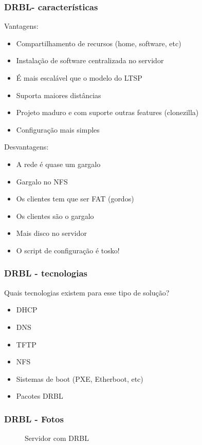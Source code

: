 \documentclass[utf8,9pt]{beamer}
\begin{document}
	  \begin{frame}
		  \frametitle{DRBL- características}
		  Vantagens:
		  \begin{itemize}
			  \item Compartilhamento de recursos (home, software, etc)
			  \item Instalação de software centralizada no servidor
			  \item É mais escalável que o modelo do LTSP
			  \item Suporta maiores distâncias 
			  \item Projeto maduro e com suporte outras features (clonezilla)
			  \item Configuração mais simples
		  \end{itemize}

		  Desvantagens:
		  \begin{itemize}
			  \item A rede é quase um gargalo
			  \item Gargalo no NFS
			  \item Os clientes tem que ser FAT (gordos)
			  \item Os clientes são o gargalo
			  \item Mais disco no servidor
			  \item O script de configuração é tosko!
		  \end{itemize}
	  \end{frame}

	  \begin{frame}
		  \frametitle{DRBL - tecnologias}
		  Quais tecnologias existem para esse tipo de solução?
		  \begin{itemize}
			  \item DHCP
			  \item DNS
			  \item TFTP
			  \item NFS
			  \item Sistemas de boot (PXE, Etherboot, etc)
			  \item Pacotes DRBL
		  \end{itemize}
	  \end{frame}

	  \begin{frame}
		  \frametitle{DRBL - Fotos}
		  \begin{center}
			  \begin{figure}
				  \caption{Servidor com DRBL}
			  \end{figure}
		  \end{center}
	  \end{frame}
\end{document}
